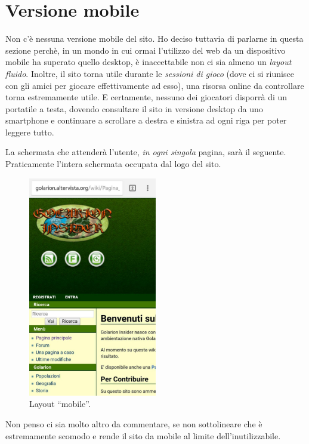 \section{Versione mobile}

Non c'è nessuna versione mobile del sito. Ho deciso tuttavia di parlarne in questa sezione
perchè, in un mondo in cui ormai l'utilizzo del web da un dispositivo mobile ha superato
quello desktop, è inaccettabile non ci sia almeno un \emph{layout fluido}.
Inoltre, il sito torna utile durante le \emph{sessioni di gioco} (dove ci si riunisce con
gli amici per giocare effettivamente ad esso), una risorsa online da controllare
torna estremamente utile. E certamente, nessuno dei giocatori disporrà di un portatile a testa,
dovendo consultare il sito in versione desktop da uno smartphone e continuare a scrollare a destra e sinistra
ad ogni riga per poter leggere tutto.

La schermata che attenderà l'utente, \emph{in ogni singola} pagina, sarà il seguente. Praticamente l'intera schermata occupata dal
logo del sito.

\begin{figure}[hbt]
    \centering
    \includegraphics[width=0.5\textwidth]{img/mobile.jpg}
    \caption{Layout ``mobile''.}
\end{figure} 

Non penso ci sia molto altro da commentare, se non sottolineare che è estremamente scomodo e rende il sito 
da mobile al limite dell'inutilizzabile.
